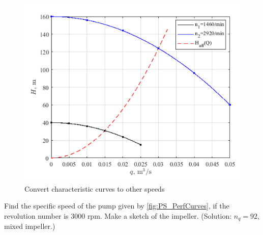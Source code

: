 \begin{figure}[ht]
\begin{center}
\includegraphics[scale=0.75]{figs/problem_2p4p22_aff_fig.png}
\caption{\label{gen_fig}Convert characteristic curves to other speeds}
\end{center}
\end{figure}

\vspace{1cm}


Find the specific speed of the pump given by \ref{fig:PS_PerfCurves}, if the revolution number is 3000 rpm. Make a sketch of the impeller. (Solution: $n_q=92$, mixed impeller.)

